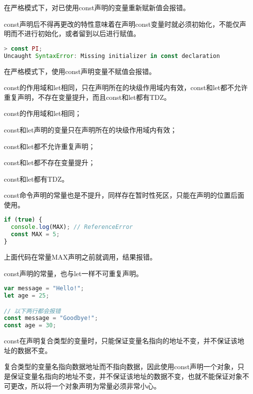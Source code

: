 在严格模式下，对已使用const声明的变量重新赋新值会报错。

const声明后不得再更改的特性意味着在声明const变量时就必须初始化，不能仅声明而不进行初始化，或者留到以后进行赋值。





\begin{lstlisting}[language=JavaScript]
> const PI;
Uncaught SyntaxError: Missing initializer in const declaration
\end{lstlisting}

在严格模式下，使用const声明变量不赋值会报错。

const的作用域和let相同，只在声明所在的块级作用域内有效，const和let都不允许重复声明，不存在变量提升，而且const和let都有TDZ。

\begin{compactitem}
\item const的作用域和let相同；
\item const和let声明的变量只在声明所在的块级作用域内有效；
\item const和let都不允许重复声明；
\item const和let都不存在变量提升；
\item const和let都有TDZ。
\end{compactitem}

const命令声明的常量也是不提升，同样存在暂时性死区，只能在声明的位置后面使用。


\begin{lstlisting}[language=JavaScript]
if (true) {
  console.log(MAX); // ReferenceError
  const MAX = 5;
}
\end{lstlisting}


上面代码在常量MAX声明之前就调用，结果报错。

const声明的常量，也与let一样不可重复声明。

\begin{lstlisting}[language=JavaScript]
var message = "Hello!";
let age = 25;

// 以下两行都会报错
const message = "Goodbye!";
const age = 30;
\end{lstlisting}

const在声明复合类型的变量时，只能保证变量名指向的地址不变，并不保证该地址的数据不变。

复合类型的变量名指向数据地址而不指向数据，因此使用const声明一个对象，只是保证变量名指向的地址不变，并不保证该地址的数据不变，也就不能保证对象不可更改，所以将一个对象声明为常量必须非常小心。








